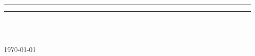 \NoBgThispage
\begin{titlepage}
	\center
	{\scshape\LARGE\institution \par}
	\vspace{0.5cm}
	{\scshape\Large \doctype \par}
	\vspace{1cm}
    \rule{\linewidth}{0.5mm}
	{\huge\bfseries \doctitle\par}
	\rule{\linewidth}{0.5mm}
	\vspace{1.5cm}
	
\begin{minipage}{0.4\textwidth}
    \begin{flushleft}
        \large
        \textit{}
        
        \textsc{\authorname{}}
    \end{flushleft}
\end{minipage}
~
\begin{minipage}{0.4\textwidth}
    \begin{flushright}
        \large
        \textit{}
        
        \textsc{\authorcontact{}}
    \end{flushright}
\end{minipage}

	\vfill
	{\large \texttt{\group} \\\today\par}
    \end{titlepage}
\newpage